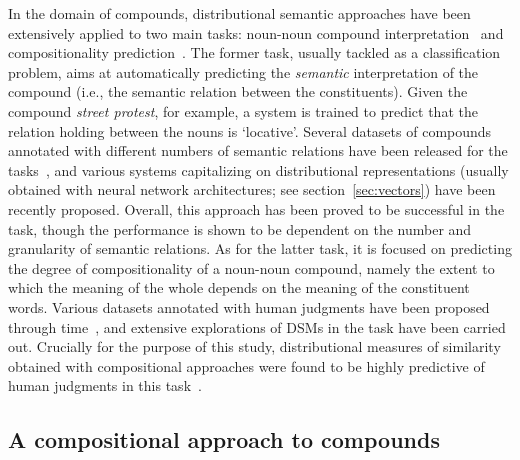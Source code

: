 \documentclass[output=paper]{langsci/langscibook}
\begin{document}
In the domain of compounds, distributional semantic approaches have been extensively applied to two main tasks: noun-noun compound interpretation~\citep{van2013melodi,dima2015automatic,dima2016compositionality,P18-1111,fares2018transfer} and compositionality prediction~\citep{reddy2011empirical,im2013exploring,salehi2014using,salehi2015word,cordeiro2016predicting}. The former task, usually tackled as a classification problem, aims at automatically predicting the \emph{semantic} interpretation of the compound (i.e., the semantic relation between the constituents). Given the compound \emph{street protest}, for example, a system is trained to predict that the relation holding between the nouns is `locative'. Several datasets of compounds annotated with different numbers of semantic relations have been released for the tasks~\citep{o2007annotating,tratz2010taxonomy}, and various systems capitalizing on distributional representations (usually obtained with neural network architectures; see section~\ref{sec:vectors}) have been recently proposed. Overall, this approach has been proved to be successful in the task, though the performance is shown to be dependent on the number and granularity of semantic relations. As for the latter task, it is focused on predicting the degree of compositionality of a noun-noun compound, namely the extent to which the meaning of the whole depends on the meaning of the constituent words. Various datasets annotated with human judgments have been proposed through time~\citep{reddy2011empirical,roller2013expected,farahmand2015multiword}, and extensive explorations of DSMs in the task have been carried out. Crucially for the purpose of this study, distributional measures of similarity obtained with compositional approaches were found to be highly predictive of human judgments in this task~\citep{reddy2011empirical,im2013exploring,salehi2015word,cordeiro2016predicting}.

\subsection{A compositional approach to compounds}\label{sec:compapp}
\end{document}
